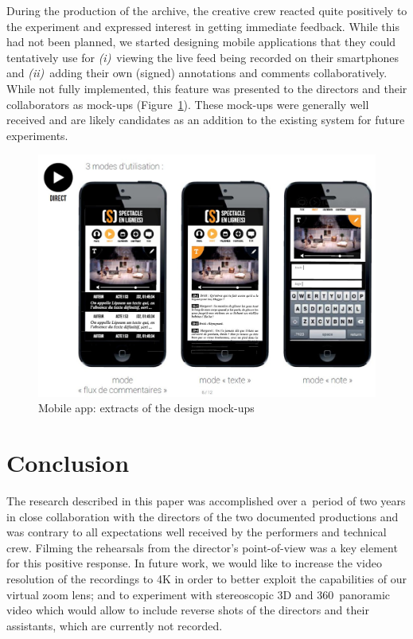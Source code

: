 \documentclass[conference]{IEEEtran}
\begin{document}
During the production of the archive, the creative crew reacted quite positively to the experiment and expressed  interest in getting immediate feedback. While this had not been planned, we started designing mobile applications that they could tentatively use for \emph{(i)}~viewing the live feed being recorded on their smartphones and \emph{(ii)}~adding their own (signed) annotations and comments collaboratively.  While not fully implemented, this feature was presented to the directors and their collaborators as mock-ups (Figure~\ref{fig:mobileapp}). These mock-ups were generally well received and are likely candidates  as an addition to the existing system for future experiments. 

\begin{figure}[htb!]
  \centering
  \includegraphics[width=\columnwidth]{mobileapp}
  \caption{Mobile app: extracts of the design mock-ups}
  \label{fig:mobileapp}
\end{figure}


 


\section{Conclusion}
\label{sec:conclusion}

The research described in this paper was accomplished over a~period of two years 
in close collaboration with the directors of the two documented productions and was 
contrary to all expectations well received by the performers and technical crew. Filming the rehearsals
from the director's point-of-view was a key element for this positive response. In future work,
we would like to increase the video resolution of the recordings to 4K in order to better exploit
the capabilities of our virtual zoom lens; and to experiment with stereoscopic 3D and 360\degree~panoramic video
which would allow to include reverse shots of the directors and their assistants, which are currently not recorded.
\end{document}
